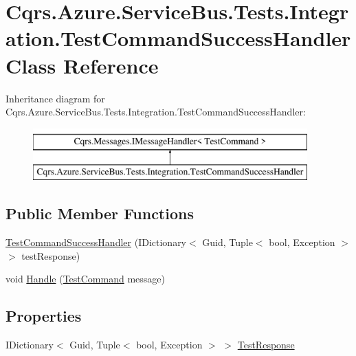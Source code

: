 \hypertarget{classCqrs_1_1Azure_1_1ServiceBus_1_1Tests_1_1Integration_1_1TestCommandSuccessHandler}{}\section{Cqrs.\+Azure.\+Service\+Bus.\+Tests.\+Integration.\+Test\+Command\+Success\+Handler Class Reference}
\label{classCqrs_1_1Azure_1_1ServiceBus_1_1Tests_1_1Integration_1_1TestCommandSuccessHandler}
Inheritance diagram for Cqrs.\+Azure.\+Service\+Bus.\+Tests.\+Integration.\+Test\+Command\+Success\+Handler\+:\begin{figure}[H]
\begin{center}
\leavevmode
\includegraphics[height=2.000000cm]{classCqrs_1_1Azure_1_1ServiceBus_1_1Tests_1_1Integration_1_1TestCommandSuccessHandler}
\end{center}
\end{figure}
\subsection*{Public Member Functions}
\begin{DoxyCompactItemize}
\item 
\hyperlink{classCqrs_1_1Azure_1_1ServiceBus_1_1Tests_1_1Integration_1_1TestCommandSuccessHandler_a1ffd3c5c1e179f38bbccbbdec48e9701_a1ffd3c5c1e179f38bbccbbdec48e9701}{Test\+Command\+Success\+Handler} (I\+Dictionary$<$ Guid, Tuple$<$ bool, Exception $>$$>$ test\+Response)
\item 
void \hyperlink{classCqrs_1_1Azure_1_1ServiceBus_1_1Tests_1_1Integration_1_1TestCommandSuccessHandler_a235fa7b6ffe7108a47e33d5eb1c4fa49_a235fa7b6ffe7108a47e33d5eb1c4fa49}{Handle} (\hyperlink{classCqrs_1_1Azure_1_1ServiceBus_1_1Tests_1_1Unit_1_1TestCommand}{Test\+Command} message)
\end{DoxyCompactItemize}
\subsection*{Properties}
\begin{DoxyCompactItemize}
\item 
I\+Dictionary$<$ Guid, Tuple$<$ bool, Exception $>$ $>$ \hyperlink{classCqrs_1_1Azure_1_1ServiceBus_1_1Tests_1_1Integration_1_1TestCommandSuccessHandler_a2e843e55bab5553cd1ecfaa330d76ef2_a2e843e55bab5553cd1ecfaa330d76ef2}{Test\+Response}
\end{DoxyCompactItemize}


